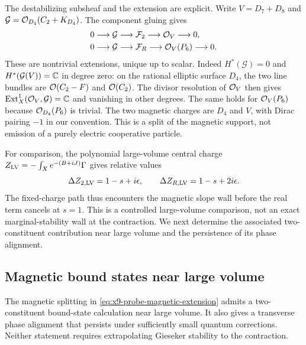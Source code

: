 The destabilizing subsheaf and the extension are explicit. Write
$V=D_7+D_8$ and
$\mathcal G=\mathcal O_{D_4}(C_2+K_{D_4})$. The component gluing gives
\begin{equation}
 \begin{aligned}
 0&\longrightarrow\mathcal G\longrightarrow\mathcal F_2
       \longrightarrow\mathcal O_V\longrightarrow0,\\
 0&\longrightarrow\mathcal G\longrightarrow\mathcal F_R
       \longrightarrow\mathcal O_V(P_6)\longrightarrow0.
 \end{aligned}
 \label{eq:x9-probe-magnetic-extension}
\end{equation}
These are nontrivial extensions, unique up to scalar. Indeed
$H^*(\mathcal G)=0$ and $H^*(\mathcal G(V))=\mathbb C$ in degree zero:
on the rational elliptic surface $D_4$, the two line bundles are
$\mathcal O(C_2-F)$ and $\mathcal O(C_2)$. The divisor resolution of $\mathcal O_V$
then gives $\operatorname{Ext}^1_X(\mathcal O_V,\mathcal G)=\mathbb C$ and
vanishing in other degrees. The same holds for $\mathcal O_V(P_6)$ because
$\mathcal O_{D_4}(P_6)$ is trivial. The two magnetic charges are $D_4$ and
$V$, with Dirac pairing $-1$ in our convention. This is a split of
the magnetic support, not emission of a purely electric cooperative
particle.

For comparison, the polynomial large-volume central charge
$Z_{\rm LV}=-\int_Xe^{-(B+iJ)}\Gamma$
\cite[Appendix~A, eq.~(A.9)]{Denef:2007Halos} gives relative values
\begin{equation}
 \Delta Z_{2,\rm LV}=1-s+i\epsilon,\qquad
 \Delta Z_{R,\rm LV}=1-s+2i\epsilon.
 \label{eq:x9-probe-relative-central}
\end{equation}
The fixed-charge path thus encounters the magnetic slope wall before
the real term cancels at $s=1$. This is a controlled large-volume
comparison, not an exact marginal-stability wall at the contraction.
We next determine the associated two-constituent contribution
near large volume and the persistence of its phase alignment.

\subsection{Magnetic bound states near large volume}
\label{subsec:x9-probe-phase-wall}

The magnetic splitting in \eqref{eq:x9-probe-magnetic-extension}
admits a two-constituent bound-state calculation near large volume.
It also gives a transverse phase alignment that persists under
sufficiently small quantum corrections. Neither statement requires
extrapolating Gieseker stability to the contraction.

